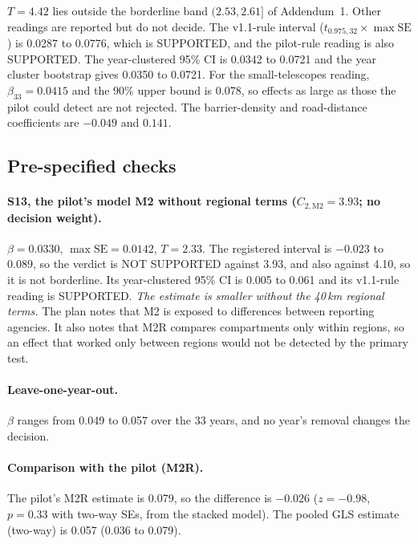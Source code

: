 \documentclass[11pt]{article}
\begin{document}
$T=4.42$ lies outside the borderline band $(2.53,2.61]$ of Addendum~1. Other readings are reported but do not decide.
The v1.1-rule interval ($t_{0.975,32}\times\max\mathrm{SE}$) is 0.0287 to 0.0776, which is SUPPORTED, and the pilot-rule reading is also SUPPORTED.
The year-clustered 95\% CI is 0.0342 to 0.0721 and the year cluster bootstrap gives 0.0350 to 0.0721.
For the small-telescopes reading, $\beta_{33}=0.0415$ and the 90\% upper bound is 0.078, so effects as large as those the pilot could detect are not rejected.
The barrier-density and road-distance coefficients are $-0.049$ and $0.141$.

\subsection{Pre-specified checks}
\paragraph{S13, the pilot's model M2 without regional terms ($C_{2,\mathrm{M2}}=3.93$; no decision weight).}
$\beta=0.0330$, $\max\mathrm{SE}=0.0142$, $T=2.33$. The registered interval is $-0.023$ to $0.089$, so the verdict is NOT SUPPORTED against 3.93,
and also against 4.10, so it is not borderline. Its year-clustered 95\% CI is 0.005 to 0.061 and its v1.1-rule reading is SUPPORTED.
\emph{The estimate is smaller without the 40\,km regional terms.} The plan notes that M2 is exposed to differences between reporting agencies.
It also notes that M2R compares compartments only within regions, so an effect that worked only between regions would not be detected by the primary test.

\paragraph{Leave-one-year-out.} $\beta$ ranges from 0.049 to 0.057 over the 33 years, and no year's removal changes the decision.

\paragraph{Comparison with the pilot (M2R).} The pilot's M2R estimate is 0.079, so the difference is $-0.026$ ($z=-0.98$, $p=0.33$ with two-way SEs,
from the stacked model). The pooled GLS estimate (two-way) is 0.057 (0.036 to 0.079).
\end{document}
